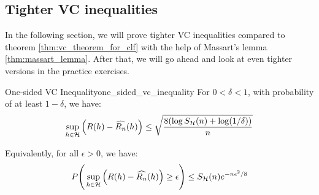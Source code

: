 \subsection{Tighter VC inequalities}
\label{sec:proof_of_vc_inequality}

In the following section, we will prove tighter VC inequalities compared to theorem \ref{thm:vc_theorem_for_clf} with the help of Massart's lemma \ref{thm:massart_lemma}. After that, we will go ahead and look at even tighter versions in the practice exercises.

\begin{theorem}{One-sided VC Inequality}{one_sided_vc_inequality}
    For $0 < \delta < 1$, with probability of at least $1-\delta$, we have:
    \begin{align*}
        \sup_{h\in\mathcal{H}} \Big( 
            R(h) - \widehat{R_n}(h)
         \Big) \le \sqrt{
            \frac{8(\log S_{\mathcal{H}}(n) + \log(1/\delta))}{n}
        }
    \end{align*}

    \noindent Equivalently, for all $\epsilon>0$, we have:
    \begin{align*}
        P\Bigg( 
            \sup_{h\in\mathcal{H}} \Big( 
                R(h) - \widehat{R_n}(h)
             \Big) \ge \epsilon
         \Bigg) \le S_{\mathcal{H}}(n)e^{-n\epsilon^2/8}
    \end{align*}
\end{theorem}

